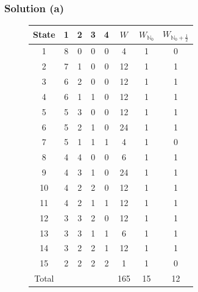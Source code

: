\documentclass[12pt]{article}
\begin{document}
        \subsubsection{Solution (a)}
            \begin{figure}
                \vspace{-30pt}
                \tiny
                \begin{flushright}
                    \begin{tabular}{| c | c | c | c | c | c | c | c |} \hline
                        State   &1  &2  &3  &4  &$W$    &$W_{\mathbb{N}_0}$ &$W_{\mathbb{N}_0 + \frac{1}{2}}$\\ \hline
                        1       &8  &0  &0  &0  &4      &1                  &0\\
                        2       &7  &1  &0  &0  &12     &1                  &1\\
                        3       &6  &2  &0  &0  &12     &1                  &1\\
                        4       &6  &1  &1  &0  &12     &1                  &1\\
                        5       &5  &3  &0  &0  &12     &1                  &1\\
                        6       &5  &2  &1  &0  &24     &1                  &1\\
                        7       &5  &1  &1  &1  &4      &1                  &0\\
                        8       &4  &4  &0  &0  &6      &1                  &1\\
                        9       &4  &3  &1  &0  &24     &1                  &1\\
                        10      &4  &2  &2  &0  &12     &1                  &1\\
                        11      &4  &2  &1  &1  &12     &1                  &1\\
                        12      &3  &3  &2  &0  &12     &1                  &1\\
                        13      &3  &3  &1  &1  &6      &1                  &1\\
                        14      &3  &2  &2  &1  &12     &1                  &1\\
                        15      &2  &2  &2  &2  &1      &1                  &0\\ \hline
                        Total   &   &   &   &   &165    &15                 &12\\ \hline
                    \end{tabular}
                \end{flushright}
            \end{figure}
\end{document}

